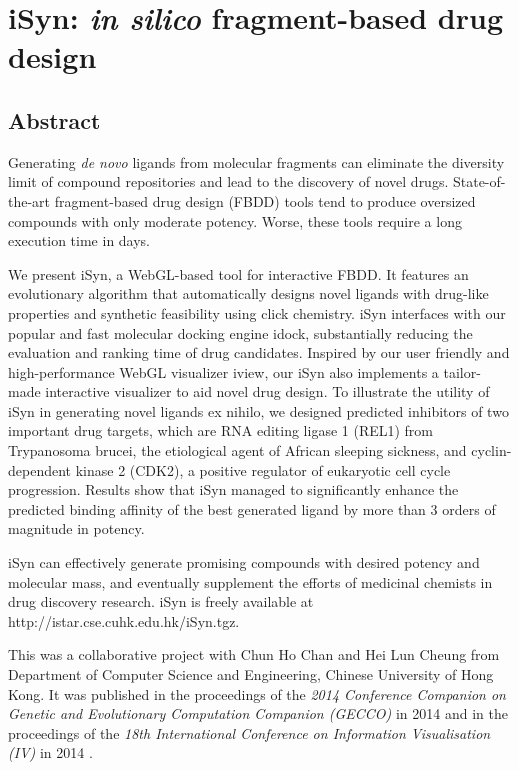 \chapter{iSyn: \textit{in silico} fragment-based drug design}

\section{Abstract}

Generating \textit{de novo} ligands from molecular fragments can eliminate the diversity limit of compound repositories and lead to the discovery of novel drugs. State-of-the-art fragment-based drug design (FBDD) tools tend to produce oversized compounds with only moderate potency. Worse, these tools require a long execution time in days.

We present iSyn, a WebGL-based tool for interactive FBDD. It features an evolutionary algorithm that automatically designs novel ligands with drug-like properties and synthetic feasibility using click chemistry. iSyn interfaces with our popular and fast molecular docking engine idock, substantially reducing the evaluation and ranking time of drug candidates. Inspired by our user friendly and high-performance WebGL visualizer iview, our iSyn also implements a tailor-made interactive visualizer to aid novel drug design. To illustrate the utility of iSyn in generating novel ligands ex nihilo, we designed predicted inhibitors of two important drug targets, which are RNA editing ligase 1 (REL1) from Trypanosoma brucei, the etiological agent of African sleeping sickness, and cyclin-dependent kinase 2 (CDK2), a positive regulator of eukaryotic cell cycle progression. Results show that iSyn managed to significantly enhance the predicted binding affinity of the best generated ligand by more than 3 orders of magnitude in potency.

iSyn can effectively generate promising compounds with desired potency and molecular mass, and eventually supplement the efforts of medicinal chemists in drug discovery research. iSyn is freely available at http://istar.cse.cuhk.edu.hk/iSyn.tgz.

This was a collaborative project with Chun Ho Chan and Hei Lun Cheung from Department of Computer Science and Engineering, Chinese University of Hong Kong. It was published in the proceedings of the \textit{2014 Conference Companion on Genetic and Evolutionary Computation Companion (GECCO)} in 2014 \citep{1409} and in the proceedings of the \textit{18th International Conference on Information Visualisation (IV)} in 2014 \citep{1387}.

